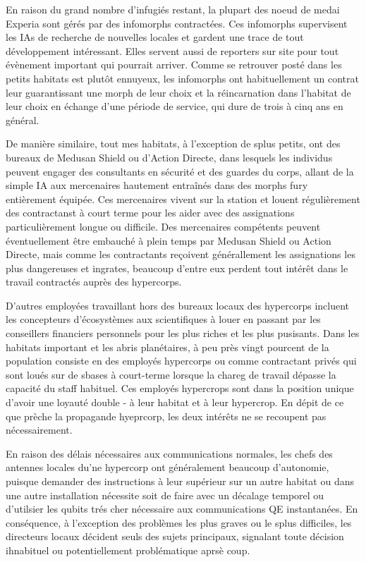 En raison du grand nombre d'infugiés restant, la plupart des noeud de medai Experia sont gérés par des infomorphs contractées. Ces infomorphs supervisent les IAs de recherche de nouvelles locales et gardent une trace de tout développement intéressant. Elles servent aussi de reporters sur site pour tout évènement important qui pourrait arriver. Comme se retrouver posté dans les petits habitats est plutôt ennuyeux, les infomorphs ont habituellement un contrat leur guarantissant une morph de leur choix et la réincarnation dans l'habitat de leur choix en échange d'une période de service, qui dure de trois à cinq ans en général. 

De manière similaire, tout mes habitats, à l'exception de splus petits, ont des bureaux de Medusan Shield ou d'Action Directe, dans lesquels les individus peuvent engager des consultants en sécurité et des guardes du corps, allant de la simple IA aux mercenaires hautement entraînés dans des morphs fury entièrement équipée. Ces mercenaires vivent sur la station et louent régulièrement des contractanst à court terme pour les aider avec des assignations particulièrement longue ou difficile. Des mercenaires compétents peuvent éventuellement être embauché à plein temps par Medusan Shield ou Action Directe, mais comme les contractants reçoivent générallement les assignations les plus dangereuses et ingrates, beaucoup d'entre eux perdent tout intérêt dans le travail contractés auprès des hypercorps. 

D'autres employées travaillant hors des bureaux locaux des hypercorps incluent les concepteurs d'écosystèmes aux scientifiques à louer en passant par les conseillers financiers personnels pour les plus riches et les plus pusisants. Dans les habitats important et les abris planétaires, à peu près vingt pourcent de la population consiste en des employés hypercorps ou comme contractant privés qui sont loués sur de sbases à court-terme lorsque la chareg de travail dépasse la capacité du staff habituel. Ces employés hypercrops sont dans la position unique d'avoir une loyauté double - à leur habitat et à leur hypercrop. En dépit de ce que prèche la propagande hyeprcorp, les deux intérêts ne se recoupent pas nécessairement. 

En raison des délais nécessaires aux communications normales, les chefs des antennes locales du'ne hypercorp ont généralement beaucoup d'autonomie, puisque demander des instructions à leur supérieur sur un autre habitat ou dans une autre installation nécessite soit de faire avec un décalage temporel ou d'utilsier les qubits trés cher nécessaire aux communications QE instantanées. En conséquence, à l'exception des problèmes les plus graves ou le splus difficiles, les directeurs locaux décident seuls des sujets principaux, signalant toute décision ihnabituel ou potentiellement problématique aprsè coup. 


